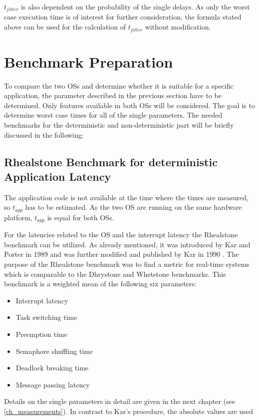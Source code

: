 $ t_{jitter} $ is also dependent on the probability of the single delays.
As only the worst case execution time is of interest for further consideration, the formula stated above can be used for the calculation of $ t_{jitter} $ without modification.     

\section{Benchmark Preparation}
To compare the two \acp{OS} and determine whether it is suitable for a specific application, the parameter described in the previous section have to be determined.
Only features available in both \acp{OS} will be considered.
The goal is to determine worst case times for all of the single parameters.
The needed benchmarks for the deterministic and non-deterministic part will be briefly discussed in the following:
\subsection{Rhealstone Benchmark for deterministic Application Latency}\label{ss_rhealstone_benchmark_for_deterministic_application_latency}
The application code is not available at the time where the times are measured, so $ t_{app} $ has to be estimated. As the two \ac{OS} are running on the same hardware platform, $ t_{app} $ is equal for both \acp{OS}.
\par
For the latencies related to the \ac{OS} and the interrupt latency the Rhealstone benchmark can be utilized. 
As already mentioned, it was introduced by Kar and Porter in 1989 \cite{kar:artbp} and was further modified and published by Kar in 1990 \cite{kar:itrb}.
The purpose of the Rhealstone benchmark was to find a metric for real-time systems which is comparable to the Dhrystone \cite{weicker:dasspb} and Whetstone \cite{wichmann:asb} benchmarks.
This benchmark is a weighted mean of the following six parameters:
\begin{itemize}
	\item Interrupt latency
	\item Task switching time
	\item Preemption time
	\item Semaphore shuffling time
	\item Deadlock breaking time
	\item Message passing latency
\end{itemize}
Details on the single parameters in detail are given in the next chapter (see \ref{ch_measurements}).
In contrast to Kar's procedure, the absolute values are used 

